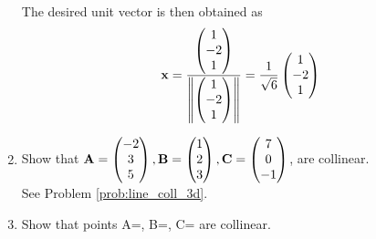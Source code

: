\documentclass[journal,12pt,twocolumn]{IEEEtran}
\renewcommand\thesection{\arabic{section}}
\begin{document}
\begin{enumerate}[label=\thesection.\arabic*.,ref=\thesection.\theenumi]
\begin{align}
\end{align}
%
The desired unit vector is then obtained as
%
\begin{align}
\mathbf{x} =\frac{\begin{pmatrix}1\\-2\\1\end{pmatrix}}{\left\lVert\begin{pmatrix}1\\-2\\1\end{pmatrix}\right\rVert}
=\frac{1}{\sqrt{6}}\begin{pmatrix}1\\-2\\1\end{pmatrix}
\end{align}
\item Show that 
$\mathbf{A}=\begin{pmatrix}-2\\3\\5\end{pmatrix}, \mathbf{B}=\begin{pmatrix}1\\2\\3\end{pmatrix}, \mathbf{C}=\begin{pmatrix}7\\0\\-1\end{pmatrix}$, are collinear.
%
\\
\solution See Problem \ref{prob:line_coll_3d}.

\item Show that points A=, B=, C= are collinear.
\\
\solution 


\end{enumerate}
\end{document}
